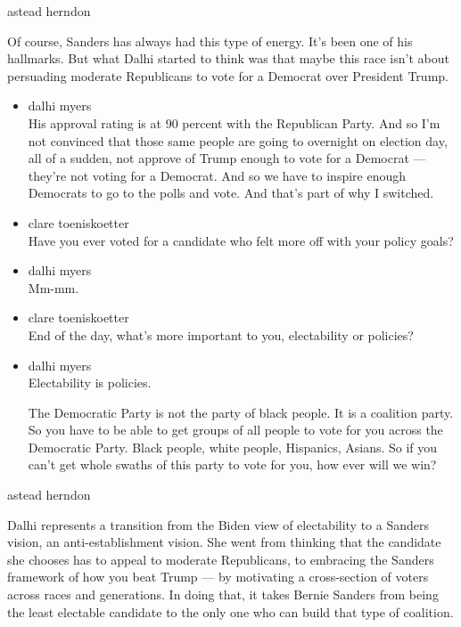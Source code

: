 astead herndon

Of course, Sanders has always had this type of energy. It's been one of
his hallmarks. But what Dalhi started to think was that maybe this race
isn't about persuading moderate Republicans to vote for a Democrat over
President Trump.

\begin{itemize}
\item
  dalhi myers\\
  His approval rating is at 90 percent with the Republican Party. And so
  I'm not convinced that those same people are going to overnight on
  election day, all of a sudden, not approve of Trump enough to vote for
  a Democrat --- they're not voting for a Democrat. And so we have to
  inspire enough Democrats to go to the polls and vote. And that's part
  of why I switched.
\item
  clare toeniskoetter\\
  Have you ever voted for a candidate who felt more off with your policy
  goals?
\item
  dalhi myers\\
  Mm-mm.
\item
  clare toeniskoetter\\
  End of the day, what's more important to you, electability or
  policies?
\item
  dalhi myers\\
  Electability is policies.

  The Democratic Party is not the party of black people. It is a
  coalition party. So you have to be able to get groups of all people to
  vote for you across the Democratic Party. Black people, white people,
  Hispanics, Asians. So if you can't get whole swaths of this party to
  vote for you, how ever will we win?
\end{itemize}

astead herndon

Dalhi represents a transition from the Biden view of electability to a
Sanders vision, an anti-establishment vision. She went from thinking
that the candidate she chooses has to appeal to moderate Republicans, to
embracing the Sanders framework of how you beat Trump --- by motivating
a cross-section of voters across races and generations. In doing that,
it takes Bernie Sanders from being the least electable candidate to the
only one who can build that type of coalition.

